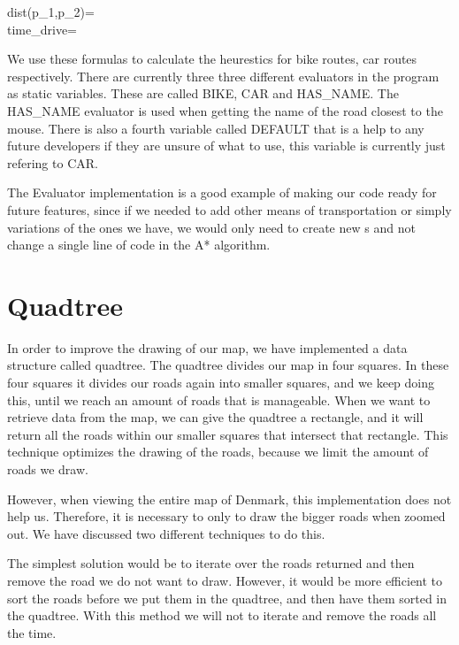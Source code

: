 \begin{center}
dist(p_{1},p_{2})= \\

time_{drive}=
\end{center}

We use these formulas to calculate the heurestics for bike routes, car routes respectively.
There are currently three three different evaluators in the program as static variables. These
are called BIKE, CAR and HAS_NAME. The HAS_NAME evaluator is used when getting the name of the
road closest to the mouse. There is also a fourth variable called DEFAULT that is a help to
any future developers if they are unsure of what to use, this variable is currently just refering
to CAR. 

The Evaluator implementation is a good example of making our code ready for future features, 
since if we needed to add other means of transportation or simply variations of the ones 
we have, we would only need to create new s and not change 
a single line of code in the A* algorithm.

\section{Quadtree}
\label{IMPL-QT}
In order to improve the drawing of our map, we have implemented a data structure 
called quadtree. The quadtree divides our map in four squares. In these four squares 
it divides our roads again into smaller squares, and we keep doing this, until we reach 
an amount of roads that is manageable.
When we want to retrieve data from the map, we can give the quadtree a
rectangle, and it will return all the roads within our smaller squares that intersect
that rectangle. This technique optimizes the drawing of the roads, because we
limit the amount of roads we draw.

However, when viewing the entire map of Denmark, this implementation does not help 
us. Therefore, it is necessary to only to draw the bigger roads when zoomed out. We 
have discussed two different techniques to do this.

The simplest solution would be to iterate over the roads returned and then
remove the road we do not want to draw. However, it would be more efficient to sort the 
roads before we put them in the quadtree, and then have them sorted in the quadtree. 
With this method we will not to iterate and remove the roads all the time.

